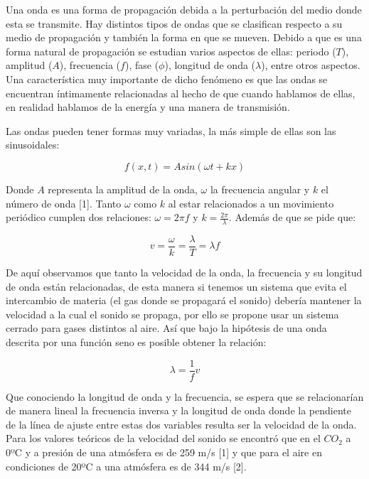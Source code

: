 \documentclass[10pt,a4paper]{article}
\begin{document}
Una onda es una forma de propagación debida a la perturbación del medio donde esta se transmite. Hay distintos tipos de ondas que se clasifican respecto a su medio de propagación y también la forma en que se mueven. Debido a que es una forma natural de propagación se estudian varios aspectos de ellas: periodo ($T$), amplitud ($A$), frecuencia ($f$), fase ($\phi$), longitud de onda ($\lambda$), entre otros aspectos. Una característica muy importante de dicho fenómeno es que las ondas  se encuentran íntimamente relacionadas al hecho de que cuando hablamos de ellas, en realidad hablamos de la energía y una manera de transmisión. 

Las ondas pueden tener formas muy variadas, la más simple de ellas son las sinusoidales:

\begin{equation}
	f(x,t) = A sin (\omega t + kx) 
\end{equation}

Donde $A$ representa la amplitud de la onda, $\omega$ la frecuencia angular y $k$ el número de onda [1]. Tanto $\omega$ como $k$ al estar relacionados a un movimiento periódico cumplen dos relaciones: $\omega = 2\pi f$ y $k = \frac{2\pi}{\lambda}$. Además de que se pide que:

\begin{equation}
	v  = \frac{\omega}{k} = \frac{\lambda}{T} = \lambda f
\end{equation}

De aquí observamos que tanto la velocidad de la onda, la frecuencia y su longitud de onda están relacionadas, de esta manera si tenemos un sistema que evita el intercambio de materia (el gas donde se propagará el sonido) debería mantener la velocidad a la cual el sonido se propaga, por ello se propone usar un sistema cerrado para gases distintos al aire. Así que bajo la hipótesis de una onda descrita por una función seno es posible obtener la relación:

\begin{equation}
    \lambda = \frac{1}{f}v
\end{equation}

Que conociendo la longitud de onda y la frecuencia, se espera que se  relacionarían de manera lineal la frecuencia inversa y la longitud de onda donde la pendiente de la línea de ajuste entre estas dos variables resulta ser la velocidad de la onda. Para los valores teóricos de la velocidad del  sonido se encontró que en el $CO_2$ a 0ºC y a presión de una atmósfera es de  259 m/s [1] y que para el aire en condiciones de 20ºC a una atmósfera es de 344 m/s [2].
\end{document}
